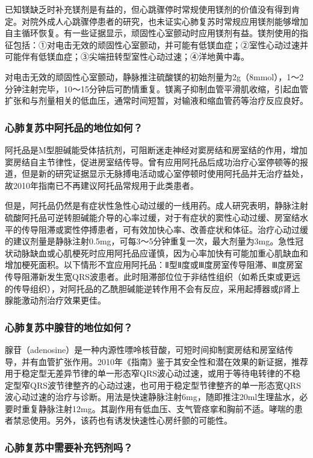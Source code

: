 已知镁缺乏时补充镁剂是有益的，但心跳骤停时常规使用镁剂的价值没有得到肯定。对院外成人心跳骤停患者的研究，也未证实心肺复苏时常规应用镁剂能够增加自主循环恢复。有一些证据显示，顽固性心室颤动时应用镁剂有益。镁剂使用的指征包括：①对电击无效的顽固性心室颤动，并可能有低镁血症；②室性心动过速并可能伴有低镁血症；③尖端扭转型室性心动过速；④洋地黄中毒。

对电击无效的顽固性心室颤动，静脉推注硫酸镁的初始剂量为2g（8mmol），1～2分钟注射完毕，10～15分钟后可酌情重复。镁离子抑制血管平滑肌收缩，引起血管扩张和与剂量相关的低血压，通常时间短暂，对输液和缩血管药等治疗反应良好。

\subsubsection{心肺复苏中阿托品的地位如何？}

阿托品是M型胆碱能受体拮抗剂，可阻断迷走神经对窦房结和房室结的作用，增加窦房结自主节律性，促进房室结传导。曾有应用阿托品后成功治疗心室停顿等的报道，但是新的研究证据显示无脉搏电活动或心室停顿时使用阿托品并无治疗益处，故2010年指南已不再建议阿托品常规用于此类患者。

但是，阿托品仍然是有症状性急性心动过缓的一线用药。成人研究表明，静脉注射硫酸阿托品可逆转胆碱能介导的心率过缓，对于有症状的窦性心动过缓、房室结水平的传导阻滞或窦性停搏患者，可有效加快心率、改善症状和体征。治疗心动过缓的建议剂量是静脉注射0.5mg，可每3～5分钟重复一次，最大剂量为3mg。急性冠状动脉缺血或心肌梗死时应用阿托品应谨慎，因为心率加快有可能加重心肌缺血和增加梗死面积。以下情形不宜应用阿托品：Ⅱ型Ⅱ度或Ⅲ度房室传导阻滞、Ⅲ度房室传导阻滞新发生宽QRS波患者。此时阻滞部位位于非结性组织（如希氏束或更远的传导组织），对阿托品的乙酰胆碱能逆转作用不会有反应，采用起搏器或β肾上腺能激动剂治疗效果更佳。

\subsubsection{心肺复苏中腺苷的地位如何？}

腺苷（adenosine）是一种内源性嘌呤核苷酸，可短时间抑制窦房结和房室结传导，并有血管扩张作用。2010年《指南》鉴于其安全性和潜在效果的新证据，推荐用于稳定型无差异节律的单一形态窄QRS波心动过速，或用于等待电转律的不稳定型窄QRS波节律整齐的心动过速，也可用于稳定型节律整齐的单一形态宽QRS波心动过速的治疗与诊断。用法是快速静脉注射6mg，随即推注20ml生理盐水，必要时重复静脉注射12mg。其副作用有低血压、支气管痉挛和胸前不适。哮喘的患者禁忌使用。另外，该药也有诱发快速性心房纤颤的可能性。

\subsubsection{心肺复苏中需要补充钙剂吗？}


